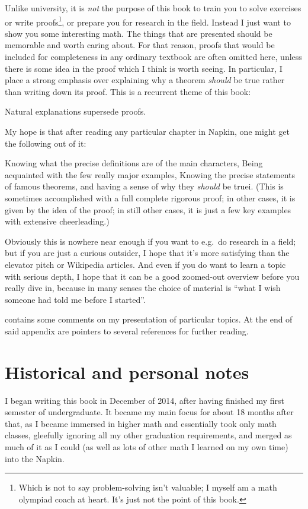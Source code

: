 Unlike university, it is \emph{not} the purpose of this book to
train you to solve exercises or write proofs\footnote{Which is
	not to say problem-solving isn't valuable;
	I myself am a math olympiad coach at heart.
	It's just not the point of this book.},
or prepare you for research in the field.
Instead I just want to show you some interesting math.
The things that are presented should be memorable and worth caring about.
For that reason, proofs that would be included for completeness
in any ordinary textbook are often omitted here,
unless there is some idea in the proof which I think is worth seeing.
In particular, I place a strong emphasis over explaining
why a theorem \emph{should} be true rather than writing down its proof.
This is a recurrent theme of this book:
\begin{moral}
	Natural explanations supersede proofs.
\end{moral}

My hope is that after reading any particular chapter in Napkin,
one might get the following out of it:
\begin{itemize}
	\ii Knowing what the precise definitions are of the main characters,
	\ii Being acquainted with the few really major examples,
	\ii Knowing the precise statements of famous theorems,
	and having a sense of why they \emph{should} be truei.
	(This is sometimes accomplished with a full complete rigorous proof;
	in other cases, it is given by the idea of the proof;
	in still other cases, it is just a few key examples
	with extensive cheerleading.)
\end{itemize}
Obviously this is nowhere near enough if you want to e.g.\ do research in a field;
but if you are just a curious outsider,
I hope that it's more satisfying than the elevator pitch or Wikipedia articles.
And even if you do want to learn a topic with serious depth,
I hope that it can be a good zoomed-out overview before you really dive in,
because in many senses the choice of material is
``what I wish someone had told me before I started''.

 contains some comments on my presentation
of particular topics.
At the end of said appendix are pointers to
several references for further reading.

\section*{Historical and personal notes}
I began writing this book in December of 2014,
after having finished my first semester of undergraduate.
It became my main focus for about 18 months after that,
as I became immersed in higher math and essentially took only math classes,
gleefully ignoring all my other graduation requirements,
and merged as much of it as I could
(as well as lots of other math I learned on my own time) into the Napkin.

